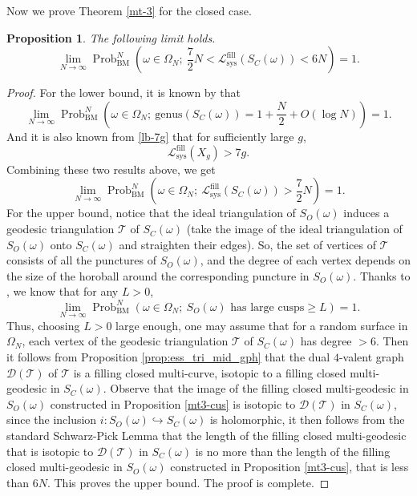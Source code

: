 \documentclass[UTF8]{amsart}
\newtheorem{proposition}[theorem]{Proposition}
\numberwithin{equation}{section}
\theoremstyle{definition}
\theoremstyle{example}
\theoremstyle{remark}
\DeclareMathOperator{\prob}{Prob}
\begin{document}
Now we prove Theorem \ref{mt-3} for the closed case.
\begin{proposition}\label{mt3-comp}
The following limit holds.
\[
		\lim\limits_{N\to \infty}\prob_{\mathrm{BM}}^N \left( \omega\in \Omega_N; \ \frac{7}{2}N <  \mathcal{L}^{\mathrm{fill}}_{\mathrm{sys}} (S_C(\omega)) < 6N \right) = 1.
	\]
\end{proposition}
\begin{proof}
For the lower bound, it is known by \cite[Corollary $5.1$ and $(2.1)$]{gamburd2006poisson} that
\[
	\lim\limits_{N\to \infty}\prob_{\mathrm{BM}}^N \left( \omega\in \Omega_N; \  \mathrm{genus}(S_C(\omega)) = 1+ \frac{N}{2} + O(\log N) \right)=1.
	\]
And it is also known from \eqref{lb-7g} that for sufficiently large $g$, 
\[\mathcal{L}^{\mathrm{fill}}_{\mathrm{sys}} (X_g)>7g.\]
Combining these two results above, we get 
\[\lim\limits_{N\to \infty}\prob_{\mathrm{BM}}^N \left( \omega\in \Omega_N; \   \mathcal{L}^{\mathrm{fill}}_{\mathrm{sys}} (S_C(\omega))>\frac{7}{2}N \right) = 1.\]
For the upper bound, notice that the ideal triangulation of $S_O(\omega)$ induces a geodesic triangulation $\mathcal{T}$ of $S_C(\omega)$ (take the image of the ideal triangulation of $S_O(\omega)$ onto $S_C(\omega)$ and straighten their edges). So, the set of vertices of $\mathcal{T}$ consists of all the punctures of $S_O(\omega)$, and the degree of each vertex depends on the size of the horoball around the corresponding puncture in $S_O(\omega)$. Thanks to 
\cite[Theorem 2.1]{brooks2004random}, we know that for any $L>0$,
	\[\lim\limits_{N\to \infty}\prob_{\mathrm{BM}}^N \left(\omega\in \Omega_N; \ S_O(\omega) \text{ has large cusps} \ge L \right)=1.
	\]
Thus, choosing $L>0$ large enough, one may assume that for a random surface in $\Omega_N$, each vertex of the geodesic triangulation $\mathcal{T}$ of $S_C(\omega)$ has degree $>6$. Then it follows from Proposition \ref{prop:ess_tri_mid_gph} that the dual $4$-valent graph $\mathcal{D}(\mathcal{T})$ of $\mathcal{T}$ is a filling closed multi-curve, isotopic to a filling closed multi-geodesic in $S_C(\omega)$. Observe that the image of the filling closed multi-geodesic in $S_O(\omega)$ constructed in Proposition \ref{mt3-cus} is isotopic to $\mathcal{D}(\mathcal{T})$ in $S_C(\omega)$, since the inclusion $i:S_O(\omega) \hookrightarrow S_C(\omega)$ is holomorphic, it then follows from the standard Schwarz-Pick Lemma that the length of the filling closed multi-geodesic that is isotopic to $\mathcal{D}(\mathcal{T})$ in $S_C(\omega)$ is no more than the length of the filling closed multi-geodesic in $S_O(\omega)$ constructed in Proposition \ref{mt3-cus}, that is less than $6N$. This proves the upper bound. The proof is complete.
\end{proof}
\end{document}
